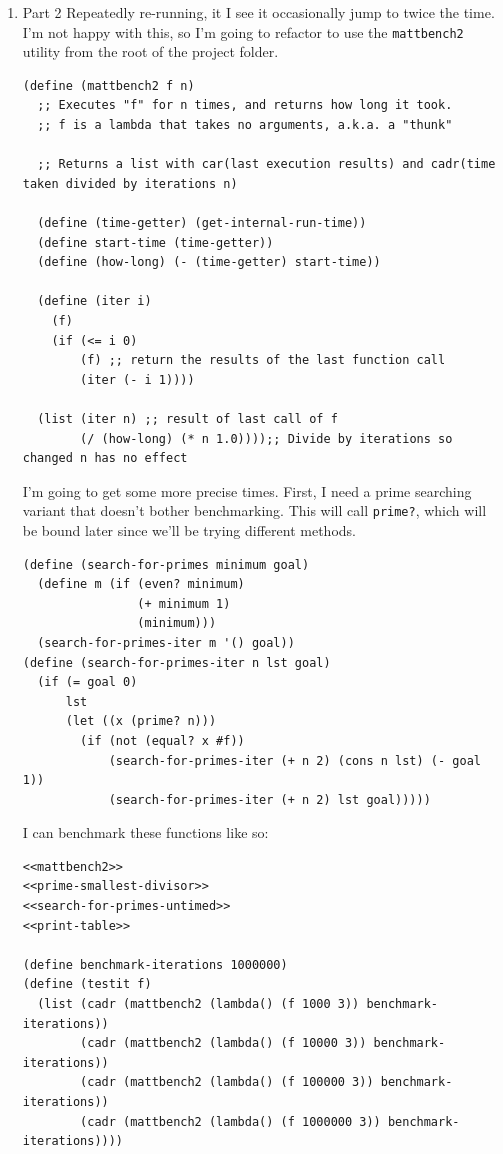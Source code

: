 \documentclass[final,fleqn,titlepage,twoside]{article}
\begin{document}
\begin{enumerate}
\item Part 2
\label{sec:org247d776}
Repeatedly re-running, it I see it occasionally jump to twice the time. I'm not
happy with this, so I'm going to refactor to use the \texttt{mattbench2}
utility from the root of the project folder.

\begin{verbatim}
(define (mattbench2 f n)
  ;; Executes "f" for n times, and returns how long it took.
  ;; f is a lambda that takes no arguments, a.k.a. a "thunk"
  
  ;; Returns a list with car(last execution results) and cadr(time taken divided by iterations n)

  (define (time-getter) (get-internal-run-time))
  (define start-time (time-getter))
  (define (how-long) (- (time-getter) start-time))

  (define (iter i)
    (f)
    (if (<= i 0)
        (f) ;; return the results of the last function call
        (iter (- i 1))))

  (list (iter n) ;; result of last call of f
        (/ (how-long) (* n 1.0))));; Divide by iterations so changed n has no effect
\end{verbatim}

I'm going to get some more precise times. First, I need a prime searching
variant that doesn't bother benchmarking. This will call \texttt{prime?},
which will be bound later since we'll be trying different methods.
\begin{verbatim}
(define (search-for-primes minimum goal)
  (define m (if (even? minimum)
                (+ minimum 1)
                (minimum)))
  (search-for-primes-iter m '() goal))
(define (search-for-primes-iter n lst goal)
  (if (= goal 0)
      lst
      (let ((x (prime? n)))
        (if (not (equal? x #f))
            (search-for-primes-iter (+ n 2) (cons n lst) (- goal 1))
            (search-for-primes-iter (+ n 2) lst goal)))))
\end{verbatim}

I can benchmark these functions like so:
\begin{verbatim}
<<mattbench2>>
<<prime-smallest-divisor>>
<<search-for-primes-untimed>>
<<print-table>>

(define benchmark-iterations 1000000)
(define (testit f)
  (list (cadr (mattbench2 (lambda() (f 1000 3)) benchmark-iterations))
        (cadr (mattbench2 (lambda() (f 10000 3)) benchmark-iterations))
        (cadr (mattbench2 (lambda() (f 100000 3)) benchmark-iterations))
        (cadr (mattbench2 (lambda() (f 1000000 3)) benchmark-iterations))))


\end{verbatim}
\end{enumerate}
\end{document}
